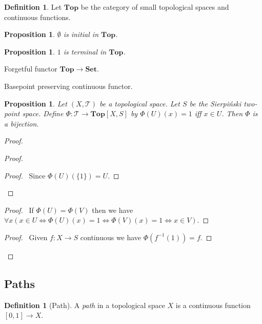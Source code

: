 \documentclass{book}
\let\qed\relax
\newtheorem{prop}[ax]{Proposition}
\theoremstyle{definition}
\newtheorem{df}[ax]{Definition}
\newcommand{\inv}[1]{\ensuremath{{#1}^{-1}}}
\newcommand{\Top}{\ensuremath{\mathbf{Top}}}
\begin{document}
\begin{df}
Let $\mathbf{Top}$ be the category of small topological spaces and continuous functions.
\end{df}

\begin{prop}
$\emptyset$ is initial in $\mathbf{Top}$.
\end{prop}

\begin{prop}
$1$ is terminal in $\mathbf{Top}$.
\end{prop}

Forgetful functor $\mathbf{Top} \rightarrow \mathbf{Set}$.

Basepoint preserving continuous functor.

\begin{prop}
Let $(X, \mathcal{T})$ be a topological space. Let $S$ be the Sierpi\'{n}ski two-point space. Define $\Phi : \mathcal{T} \rightarrow \Top[X,S]$ by $\Phi(U)(x) = 1$ iff $x \in U$. Then $\Phi$ is a bijection.
\end{prop}

\begin{proof}
\pf
{}
\begin{proof}
	\begin{proof}
		\pf\ Since $\Phi(U)(\{1\}) = U$.
	\end{proof}
\end{proof}
\begin{proof}
	\pf\ If $\Phi(U) = \Phi(V)$ then we have $\forall x (x \in U \Leftrightarrow \Phi(U)(x) = 1 \Leftrightarrow \Phi(V)(x) = 1 \Leftrightarrow x \in V)$.
\end{proof}
\begin{proof}
	\pf\ Given $f : X \rightarrow S$ continuous we have $\Phi(\inv{f}(1)) = f$.
\end{proof}
\qed
\end{proof}

\subsection{Paths}

\begin{df}[Path]
A \emph{path} in a topological space $X$ is a continuous function $[0,1] \rightarrow X$.
\end{df}
\end{document}
